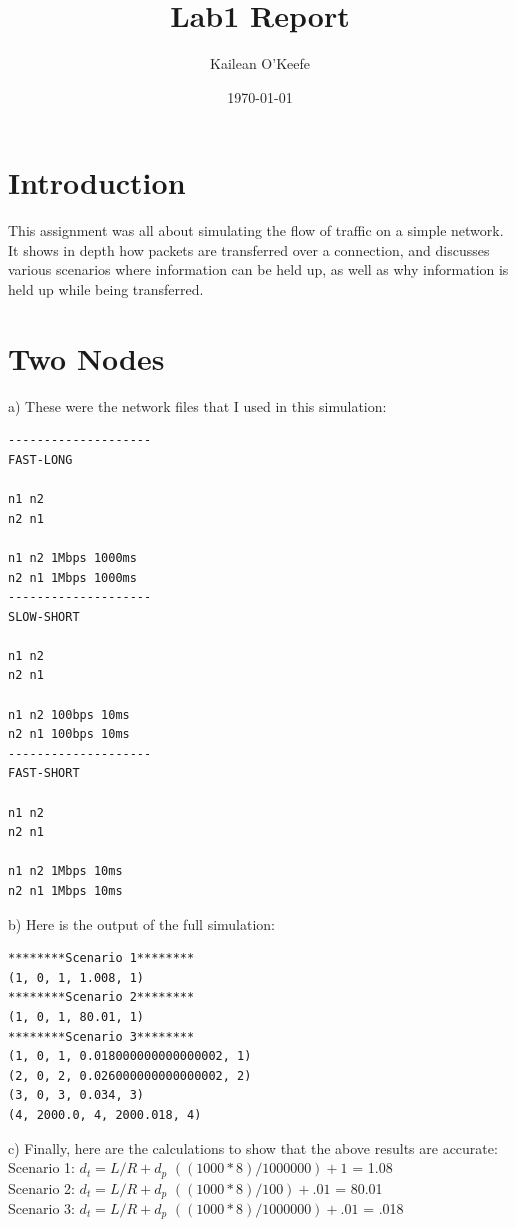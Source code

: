 \documentclass[a4paper,11pt]{article}
\begin{document}
\title{Lab1 Report}
\author{Kailean O'Keefe}
\date{\today}
\maketitle

\section*{Introduction}
This assignment was all about simulating the flow of traffic on a simple network. It shows in depth how packets are transferred over a connection, and discusses various scenarios where information can be held up, as well as why information is held up while being transferred. 

\section*{Two Nodes}
a) These were the network files that I used in this simulation:
\begin{verbatim}
--------------------
FAST-LONG

n1 n2
n2 n1

n1 n2 1Mbps 1000ms
n2 n1 1Mbps 1000ms
--------------------
SLOW-SHORT

n1 n2
n2 n1

n1 n2 100bps 10ms
n2 n1 100bps 10ms
--------------------
FAST-SHORT

n1 n2
n2 n1

n1 n2 1Mbps 10ms
n2 n1 1Mbps 10ms
\end{verbatim}
b) Here is the output of the full simulation:
\begin{verbatim}
********Scenario 1********
(1, 0, 1, 1.008, 1)
********Scenario 2********
(1, 0, 1, 80.01, 1)
********Scenario 3********
(1, 0, 1, 0.018000000000000002, 1)
(2, 0, 2, 0.026000000000000002, 2)
(3, 0, 3, 0.034, 3)
(4, 2000.0, 4, 2000.018, 4)
\end{verbatim}
c) Finally, here are the calculations to show that the above results are accurate:\\
Scenario 1: $d_t = L/R+d_p$ $((1000*8)/1000000) + 1$ = 1.08\\
Scenario 2: $d_t = L/R+d_p$ $((1000*8)/100) + .01$ = 80.01\\
Scenario 3: $d_t = L/R+d_p$ $((1000*8)/1000000) + .01$ = .018\\
\end{document}
